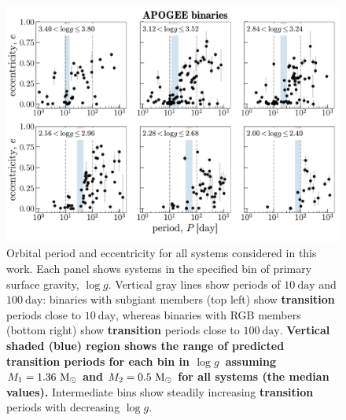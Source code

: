 \documentclass[modern, letterpaper]{aastex62}
\newcommand{\logg}{\ensuremath{\log g}}
\renewcommand{\changes}[1]{\textbf{#1}}
\begin{document}
\begin{figure}[t]
\begin{center}
\includegraphics[width=\textwidth]{P-e-grid}
\end{center}
\caption{%
Orbital period and eccentricity for all systems considered in this work.
Each panel shows systems in the specified bin of primary surface gravity, \logg.
Vertical gray lines show periods of $10~\textrm{day}$ and $100~\textrm{day}$:
binaries with subgiant members (top left) show \changes{transition} periods
close to $10~\textrm{day}$, whereas binaries with RGB members (bottom right)
show \changes{transition} periods close to $100~\textrm{day}$.
\changes{Vertical shaded (blue) region shows the range of predicted transition periods for each bin in \logg\ assuming $M_1 = 1.36~\mathrm{M}_\odot$ and $M_2 = 0.5~\mathrm{M}_\odot$ for all systems (the median values).}
Intermediate bins show steadily increasing \changes{transition} periods with
decreasing \logg.
\label{fig:P-e-grid}
}
\end{figure}
\end{document}
